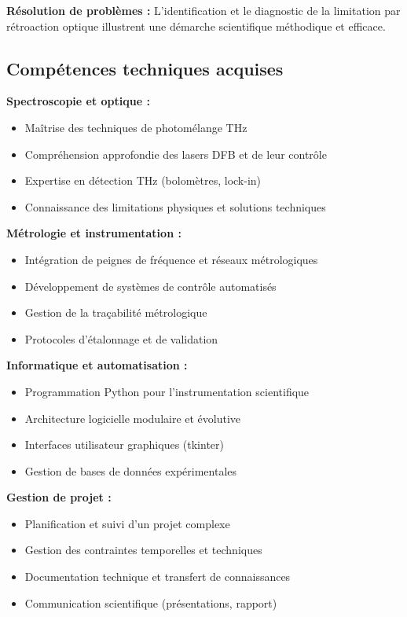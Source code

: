 \textbf{Résolution de problèmes :} L'identification et le diagnostic de la limitation par rétroaction optique illustrent une démarche scientifique méthodique et efficace.

\subsection{Compétences techniques acquises}

\textbf{Spectroscopie et optique :}
\begin{itemize}
    \item Maîtrise des techniques de photomélange THz
    \item Compréhension approfondie des lasers DFB et de leur contrôle
    \item Expertise en détection THz (bolomètres, lock-in)
    \item Connaissance des limitations physiques et solutions techniques
\end{itemize}

\textbf{Métrologie et instrumentation :}
\begin{itemize}
    \item Intégration de peignes de fréquence et réseaux métrologiques
    \item Développement de systèmes de contrôle automatisés
    \item Gestion de la traçabilité métrologique
    \item Protocoles d'étalonnage et de validation
\end{itemize}

\textbf{Informatique et automatisation :}
\begin{itemize}
    \item Programmation Python pour l'instrumentation scientifique
    \item Architecture logicielle modulaire et évolutive
    \item Interfaces utilisateur graphiques (tkinter)
    \item Gestion de bases de données expérimentales
\end{itemize}

\textbf{Gestion de projet :}
\begin{itemize}
    \item Planification et suivi d'un projet complexe
    \item Gestion des contraintes temporelles et techniques
    \item Documentation technique et transfert de connaissances
    \item Communication scientifique (présentations, rapport)
\end{itemize}


